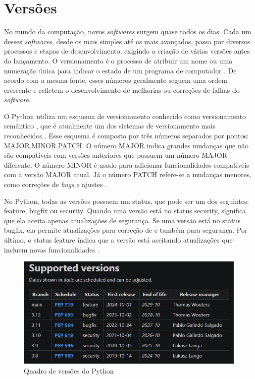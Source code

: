 \section{Versões}

No mundo da computação, novos \textit{softwares} surgem quase todos os dias. Cada um desses \textit{softwares}, desde os mais simples até os mais avançados, passa por diversos processos e etapas de desenvolvimento, exigindo a criação de várias versões antes do lançamento. O versionamento é o processo de atribuir um nome ou uma numeração única para indicar o estado de um programa de computador \cite{wikipedia_versionamento}. De acordo com a mesma fonte, esses números geralmente seguem uma ordem crescente e refletem o desenvolvimento de melhorias ou correções de falhas do \textit{software}.

O Python utiliza um esquema de versionamento conhecido como versionamento semântico \cite{hashtagtreinamentos_python_versions}, que é atualmente um dos sistemas de versionamento mais reconhecidos \cite{wikipedia_versionamento}. Esse esquema é composto por três números separados por pontos: MAJOR.MINOR.PATCH. O número MAJOR indica grandes mudanças que não são compatíveis com versões anteriores que possuem um número MAJOR diferente. O número MINOR é usado para adicionar funcionalidades compatíveis com a versão MAJOR atual. Já o número PATCH refere-se a mudanças menores, como correções de \textit{bugs} e ajustes \cite{wikipedia_versionamento}.

No Python, todas as versões possuem um status, que pode ser um dos seguintes: feature, bugfix ou security. Quando uma versão está no status security, significa que ela aceita apenas atualizações de segurança. Se uma versão está no status bugfix, ela permite atualizações para correção de  e também para segurança. Por último, o status feature indica que a versão está aceitando atualizações que incluem novas funcionalidades \cite{hashtagtreinamentos_python_versions}.

\begin{figure}
    \centering
    \includegraphics[width=0.5\linewidth]{Photos/Versoes-do-Python-4.png}
    \caption{Quadro de versões do Python \cite{hashtagtreinamentos_python_versions}}
    \label{fig:enter-label}
\end{figure}

